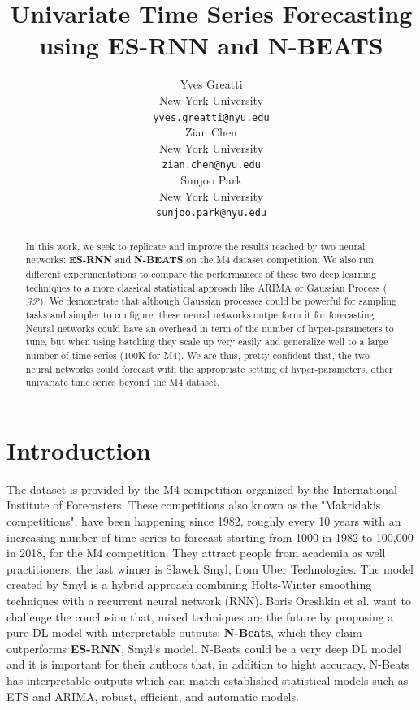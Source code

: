 \documentclass{article}
\title{Univariate Time Series Forecasting using ES-RNN and N-BEATS}
\author{%
  Yves Greatti \\
  New York University\\
  \texttt{yves.greatti@nyu.edu} \\
   \And
    Zian Chen \\
    New York University\\
    \texttt{zian.chen@nyu.edu} \\
    \And 
   Sunjoo Park\\
    New York University\\
    \texttt{sunjoo.park@nyu.edu}
}
\begin{document}
\maketitle

\begin{abstract}
  In this work, we seek to replicate and improve the results reached by two neural networks: \textbf{ES-RNN}  \cite{DBLP:journals/corr/abs-1907-03329} and \textbf{N-BEATS} \cite{DBLP:journals/corr/abs-1905-10437} on the M4 dataset competition.
  We also run different experimentations to compare the performances of these two deep learning techniques to a more classical statistical approach like ARIMA or Gaussian Process ($\mathcal{GP}$).
  We demonstrate that although Gaussian processes could be powerful for sampling tasks and simpler to configure, these neural networks outperform it for forecasting. Neural networks could have an overhead in term of the number of hyper-parameters to tune, but when using batching they scale up very easily and generalize well to a large number of time series (100K for M4). We are thus, pretty confident that, the two neural networks could forecast with the appropriate setting of hyper-parameters, other univariate time series beyond the M4 dataset.  
  
 \end{abstract}

\section{Introduction}
\label{Introduction}

The dataset is provided by the M4 competition organized by the International Institute of Forecasters. 
These competitions also known as the "Makridakis competitions", have been happening since 1982, roughly every 10 years with an increasing number of time series to forecast
starting from 1000 in 1982  to 100,000 in 2018, for the M4 competition. They attract people from academia as well practitioners, the last winner is Slawek Smyl, from Uber Technologies. 
The model created by Smyl is a hybrid approach combining Holts-Winter smoothing
techniques with a recurrent neural network (RNN). Boris 
Oreshkin et al.  \cite{DBLP:journals/corr/abs-1905-10437} want to challenge the conclusion that, mixed techniques are the future by proposing a pure DL model with interpretable outputs: \textbf{N-Beats}, which they claim outperforms \textbf{ES-RNN}, Smyl's model. 
N-Beats could be a very deep DL model and it is important for their authors that, in addition to hight accuracy, N-Beats has interpretable outputs which can match established statistical models such as ETS and ARIMA, robust, efficient, and automatic models. 
\end{document}
